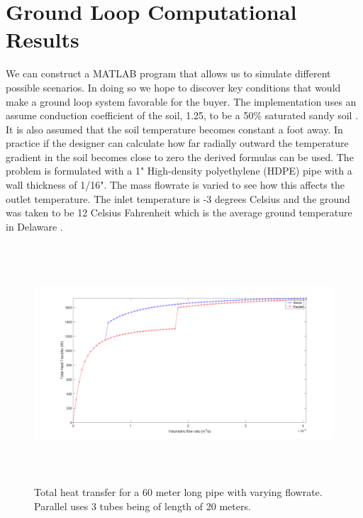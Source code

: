 \section{Ground Loop Computational Results}
%
We can construct a MATLAB program that allows us to simulate different possible scenarios. In doing so we hope to discover key conditions that would make a ground loop system favorable for the buyer. The implementation uses an assume conduction coefficient of the soil, 1.25, to be a 50\% saturated sandy soil \cite{oke2002boundary}. It is also assumed that the soil temperature becomes constant a foot away. In practice if the designer can calculate how far radially outward the temperature gradient in the soil becomes close to zero the derived formulas can be used. The problem is formulated with a 1" High-density polyethylene (HDPE) pipe with a wall thickness of 1/16". The mass flowrate is varied to see how this affects the outlet temperature. The inlet temperature is -3 degrees Celsius and the ground was taken to be 12 Celsius Fahrenheit which is the average ground temperature in Delaware \cite{SoilTemps}.
%
\begin{figure}[H]
    \centering
    \includegraphics[height=3.5in]{pictures/heat_11_ground_23_inlet.png}
    \caption{Total heat transfer for a 60 meter long pipe with varying flowrate. Parallel uses 3 tubes being of length of 20 meters.}
\end{figure}
%
